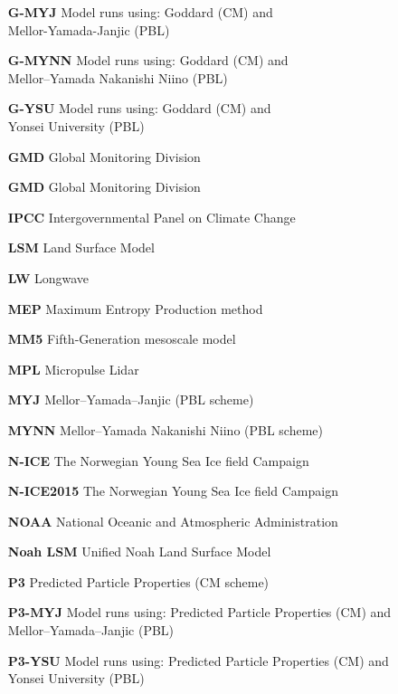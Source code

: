 \begin{enumerate}
    \item[\textbf{G-MYJ}] Model runs using: Goddard (CM) and \\
    \hspace*{3.3cm} Mellor-Yamada-Janjic (PBL)
    \item[\textbf{G-MYNN}] Model runs using: Goddard (CM) and \\
    \hspace*{3.3cm} Mellor–Yamada Nakanishi Niino (PBL)
    \item[\textbf{G-YSU}] Model runs using: Goddard (CM) and \\
    \hspace*{3.3cm} Yonsei University (PBL)
    \item[\textbf{GMD}] Global Monitoring Division
    \item[\textbf{GMD}] Global Monitoring Division
    \item[\textbf{IPCC}] Intergovernmental Panel on Climate Change
    \item[\textbf{LSM}] Land Surface Model
    \item[\textbf{LW}] Longwave
    \item[\textbf{MEP}] Maximum Entropy Production method
    \item[\textbf{MM5}] Fifth-Generation mesoscale model
    \item[\textbf{MPL}] Micropulse Lidar
    \item[\textbf{MYJ}] Mellor–Yamada–Janjic (PBL scheme)
    \item[\textbf{MYNN}] Mellor–Yamada Nakanishi Niino (PBL scheme)
    \item[\textbf{N-ICE}] The Norwegian Young Sea Ice field Campaign
    \item[\textbf{N-ICE2015}] The Norwegian Young Sea Ice field Campaign
    \item[\textbf{NOAA}] National Oceanic and Atmospheric Administration
    \item[\textbf{Noah LSM}] Unified Noah Land Surface Model
    \item[\textbf{P3}] Predicted Particle Properties (CM scheme)
    \item[\textbf{P3-MYJ}] Model runs using: Predicted Particle Properties (CM) and \\
    \hspace*{3.3cm} Mellor–Yamada–Janjic (PBL)
    \item[\textbf{P3-YSU}] Model runs using: Predicted Particle Properties (CM) and \\
    \hspace*{3.3cm} Yonsei University (PBL)

\end{enumerate}
